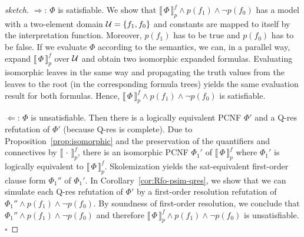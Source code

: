\documentclass{llncs}
\newcommand{\qres}{\mbox{\sf Q-res}}
\newcommand{\caU}{{\cal U}}
\newcommand{\QBFtoPL}[3]{\llbracket\,#1\,\rrbracket_{#2}^{#3}}
\renewcommand{\qed}{\hfill\ensuremath{\square}}
\begin{document}
\SatEquiv*

\begin{proof}[sketch]
\noindent
$\Longrightarrow$: $\Phi$ is satisfiable.  We show that
$\QBFtoPL{\Phi}{p}{f}\land p(f_{1}) \land \neg p(f_{0})$ has a model
with a two-element domain $\caU=\{f_{1}, f_{0}\}$ and constants are
mapped to itself by the interpretation function. Moreover, $p(f_{1})$
has to be true and $p(f_{0})$ has to be false.  If we evaluate $\Phi$
according to the semantics, we can, in a parallel way, expand
$\QBFtoPL{\Phi}{p}{f}$ over $\caU$ and obtain two isomorphic expanded
formulas. Evaluating isomorphic leaves in the same way and propagating
the truth values from the leaves to the root (in the corresponding
formula trees) yields the same evaluation result for both formulas.
Hence, $\QBFtoPL{\Phi}{p}{f}\land p(f_{1}) \land \neg p(f_{0})$ is
satisfiable.

\noindent
$\Longleftarrow$: $\Phi$ is unsatisfiable. Then there is a logically
equivalent PCNF $\Phi'$ and a \qres{} refutation of $\Phi'$
(because \qres{} is complete). Due to
Proposition~\ref{prop:isomorphic} and the preservation of the quantifiers and connectives by $\QBFtoPL{\cdot}{p}{f}$, there is an isomorphic PCNF
$\Phi_1'$ of $\QBFtoPL{\Phi}{p}{f}$ where $\Phi_1'$ is logically
equivalent to $\QBFtoPL{\Phi}{p}{f}$. Skolemization yields the
sat-equivalent first-order clause form $\Phi_1''$ of $\Phi_1'$. In
Corollary~\ref{cor:Rfo-psim-qres}, we show that we can simulate
each \qres{} refutation of $\Phi'$ by a first-order resolution
refutation of $\Phi_1'' \land p(f_{1}) \land \neg p(f_{0})$. By
soundness of first-order resolution, we conclude that $\Phi_1''\land
p(f_{1}) \land \neg p(f_{0})$ and therefore $\QBFtoPL{\Phi}{p}{f}\land
p(f_{1}) \land \neg p(f_{0})$ is unsatisfiable.  \qed
\end{proof}

\RfoPsimQU*
\end{document}
